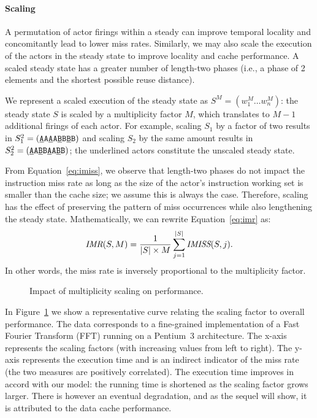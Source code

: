 \paragraph*{Scaling} A permutation of actor firings within a steady
can improve temporal locality and concomitantly lead to lower miss
rates. Similarly, 
we may also scale the execution of the actors in the steady state to
improve locality and cache performance. A scaled steady state has a
greater number of length-two phases (i.e., a phase of 2 elements and
the shortest possible reuse distance). 

We represent a scaled execution of the steady state as
$S^M=(w_1^M\dots w_n^M)$: the steady state $S$ is scaled by a
multiplicity factor $M$, which translates to $M-1$ additional firings of
each actor. For example, scaling $S_1$ by a factor of two results in
$S_1^2=(\texttt{\underline{A}A\underline{A}A\underline{B}B\underline{B}B})$
and scaling $S_2$ by the same amount results in 
$S_2^2=(\texttt{\underline{A}A\underline{B}B\underline{A}A\underline{B}B})$;
the underlined actors constitute the unscaled steady state.

From Equation~\ref{eq:imiss}, we observe that length-two  phases do
not impact the instruction miss rate  as long as the size of the actor's 
instruction working set  is smaller than the cache
size; we assume this is always the case. Therefore, scaling has the
effect of preserving the pattern of 
miss occurrences while also lengthening the steady state. Mathematically,
we can rewrite Equation~\ref{eq:imr} as:
\begin{equation}
\label{eq:imrM}
  \mbox{\it IMR}(S, M) = \frac{1}{|S|\times M}\sum_{j=1}^{|S|} \mbox{\it IMISS}(S,j).
\end{equation}
In other words, the miss rate is inversely proportional to the
multiplicity factor.
\begin{figure}[t]
\begin{center}
  \caption{Impact of multiplicity scaling on performance.}
 \label{fig:scaling-data}
\end{center}
\end{figure}

In Figure~\ref{fig:scaling-data} we show a
representative curve relating the scaling factor to overall
performance. The data corresponds to a fine-grained implementation of 
a Fast Fourier Transform (FFT) running on a Pentium~3 architecture. The
x-axis represents the scaling factors (with increasing values from
left to right). The y-axis represents the execution time and is an
indirect indicator of the miss rate (the two measures are positively
correlated). The execution time improves in accord with our model: 
the running time is shortened as the scaling factor grows larger. There
is however an eventual degradation, and as the sequel will show, it is 
attributed to the data cache performance.
